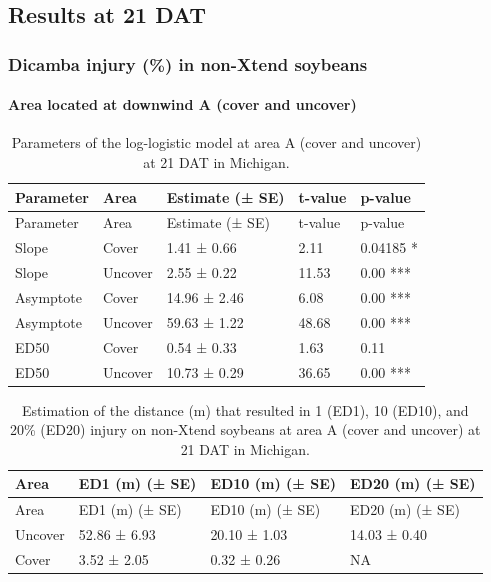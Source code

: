 \documentclass[]{article}
\let\oldparagraph\paragraph
\renewcommand{\paragraph}[1]{\oldparagraph{#1}\mbox{}}
\begin{document}
\pagebreak
\newpage

\newpage

\pagebreak

\subsection{Results at 21 DAT}\label{results-at-21-dat-1}

\subsubsection{Dicamba injury (\%) in non-Xtend
soybeans}\label{dicamba-injury-in-non-xtend-soybeans-3}

\paragraph{Area located at downwind A (cover and
uncover)}\label{area-located-at-downwind-a-cover-and-uncover}

\begin{longtable}[]{@{}lllll@{}}
\caption{Parameters of the log-logistic model at area A (cover and
uncover) at 21 DAT in Michigan.}\tabularnewline
\toprule
Parameter & Area & Estimate (± SE) & t-value & p-value\tabularnewline
\midrule
\endfirsthead
\toprule
Parameter & Area & Estimate (± SE) & t-value & p-value\tabularnewline
\midrule
\endhead
Slope & Cover & 1.41 ± 0.66 & 2.11 & 0.04185 *\tabularnewline
Slope & Uncover & 2.55 ± 0.22 & 11.53 & 0.00 ***\tabularnewline
Asymptote & Cover & 14.96 ± 2.46 & 6.08 & 0.00 ***\tabularnewline
Asymptote & Uncover & 59.63 ± 1.22 & 48.68 & 0.00 ***\tabularnewline
ED50 & Cover & 0.54 ± 0.33 & 1.63 & 0.11\tabularnewline
ED50 & Uncover & 10.73 ± 0.29 & 36.65 & 0.00 ***\tabularnewline
\bottomrule
\end{longtable}

\begin{longtable}[]{@{}llll@{}}
\caption{Estimation of the distance (m) that resulted in 1 (ED1), 10
(ED10), and 20\% (ED20) injury on non-Xtend soybeans at area A (cover
and uncover) at 21 DAT in Michigan.}\tabularnewline
\toprule
Area & ED1 (m) (± SE) & ED10 (m) (± SE) & ED20 (m) (± SE)\tabularnewline
\midrule
\endfirsthead
\toprule
Area & ED1 (m) (± SE) & ED10 (m) (± SE) & ED20 (m) (± SE)\tabularnewline
\midrule
\endhead
Uncover & 52.86 ± 6.93 & 20.10 ± 1.03 & 14.03 ± 0.40\tabularnewline
Cover & 3.52 ± 2.05 & 0.32 ± 0.26 & NA\tabularnewline
\bottomrule
\end{longtable}
\end{document}
